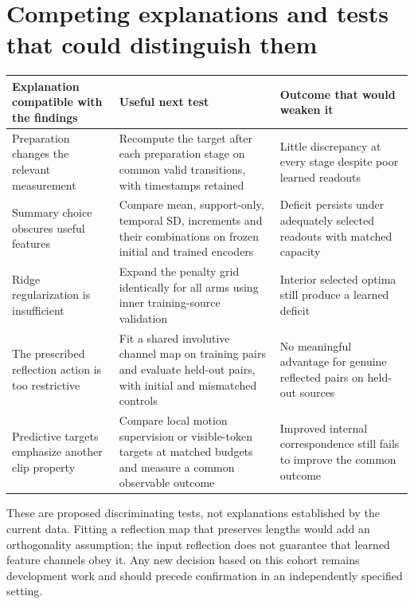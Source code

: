 \documentclass{article}
\begin{document}
\section{Competing explanations and tests that could distinguish them}\label{appendix-b.-competing-explanations-and-tests-that-could-distinguish-them}

\begin{table}[htbp]
\centering
\small
\begin{tabular}{@{}
  >{\raggedright\arraybackslash}p{}
  >{\raggedright\arraybackslash}p{}
  >{\raggedright\arraybackslash}p{}@{}}
\toprule\noalign{}
\begin{minipage}[b]{\linewidth}\raggedright
Explanation compatible with the findings
\end{minipage} & \begin{minipage}[b]{\linewidth}\raggedright
Useful next test
\end{minipage} & \begin{minipage}[b]{\linewidth}\raggedright
Outcome that would weaken it
\end{minipage} \\
\midrule\noalign{}

Preparation changes the relevant measurement & Recompute the target after each preparation stage on common valid transitions, with timestamps retained & Little discrepancy at every stage despite poor learned readouts \\
Summary choice obscures useful features & Compare mean, support-only, temporal SD, increments and their combinations on frozen initial and trained encoders & Deficit persists under adequately selected readouts with matched capacity \\
Ridge regularization is insufficient & Expand the penalty grid identically for all arms using inner training-source validation & Interior selected optima still produce a learned deficit \\
The prescribed reflection action is too restrictive & Fit a shared involutive channel map on training pairs and evaluate held-out pairs, with initial and mismatched controls & No meaningful advantage for genuine reflected pairs on held-out sources \\
Predictive targets emphasize another clip property & Compare local motion supervision or visible-token targets at matched budgets and measure a common observable outcome & Improved internal correspondence still fails to improve the common outcome \\
\bottomrule
\end{tabular}
\end{table}

These are proposed discriminating tests, not explanations established by the current data. Fitting a reflection map that preserves lengths would add an orthogonality assumption; the input reflection does not guarantee that learned feature channels obey it. Any new decision based on this cohort remains development work and should precede confirmation in an independently specified setting.
\end{document}
